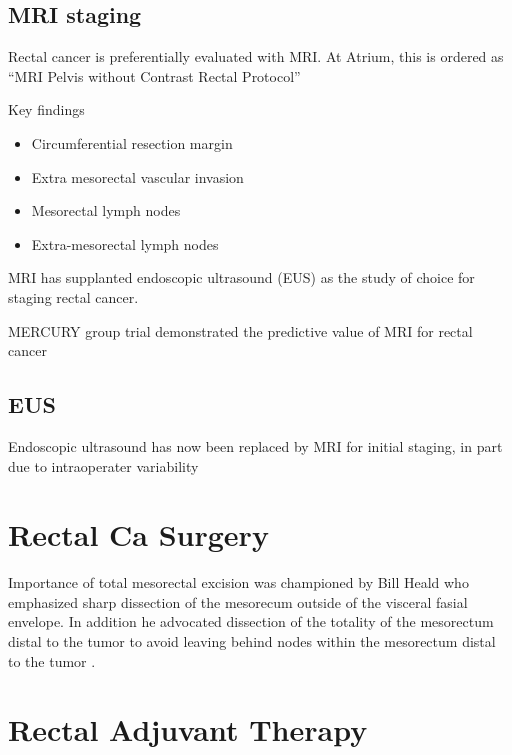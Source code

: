 \documentclass[
]{book}
\providecommand{\tightlist}{%
  \setlength{\itemsep}{0pt}\setlength{\parskip}{0pt}}
\begin{document}
\hypertarget{mri-staging}{%
\section{MRI staging}\label{mri-staging}}

Rectal cancer is preferentially evaluated with MRI. At Atrium, this is ordered as ``MRI Pelvis without Contrast Rectal Protocol''

Key findings

\begin{itemize}
\tightlist
\item
  Circumferential resection margin
\item
  Extra mesorectal vascular invasion
\item
  Mesorectal lymph nodes
\item
  Extra-mesorectal lymph nodes
\end{itemize}

MRI has supplanted endoscopic ultrasound (EUS) as the study of choice for staging rectal cancer.

MERCURY group trial demonstrated the predictive value of MRI for rectal cancer\citep{taylor34} \citep{mercurystudygroup779}

\hypertarget{eus}{%
\section{EUS}\label{eus}}

Endoscopic ultrasound has now been replaced by MRI for initial staging, in part due to intraoperater variability

\hypertarget{rectal-ca-surgery}{%
\chapter{Rectal Ca Surgery}\label{rectal-ca-surgery}}

Importance of total mesorectal excision was championed by Bill Heald \citep{heald1479} who emphasized sharp dissection of the mesorecum outside of the visceral fasial envelope. In addition he advocated dissection of the totality of the mesorectum distal to the tumor to avoid leaving behind nodes within the mesorectum distal to the tumor\citep{quirke996} \citep{nagtegaal303} \citep{paty365}.

\hypertarget{rectal-adjuvant-therapy}{%
\chapter{Rectal Adjuvant Therapy}\label{rectal-adjuvant-therapy}}
\end{document}
